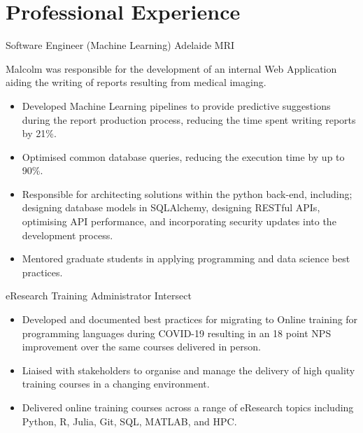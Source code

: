 



\makecvtitle{}
\vspace{-4em}

\section{Professional Experience}

{Software Engineer (Machine Learning)}
{Adelaide MRI}{}{}
{%
  Malcolm was responsible for the development of an internal Web Application
  aiding the writing of reports resulting from medical imaging. 
  \begin{itemize} 
    \item Developed Machine Learning pipelines to provide predictive
      suggestions during the report production process, reducing the time spent
      writing reports by 21\%.
    \item Optimised common database queries, reducing the execution time by
      up to 90\%.
    \item Responsible for architecting solutions
      within the python back-end, including; 
      designing database models in SQLAlchemy,
      designing RESTful APIs,
      optimising API performance,
      and incorporating security updates into the development process.
    \item Mentored graduate students in applying programming and data science
      best practices.
  \end{itemize}
}

{eResearch Training Administrator}
{Intersect}{}{}
{%
  \begin{itemize}
    \item Developed and documented best practices for migrating to Online
      training for programming languages during COVID-19 resulting in an
      18 point NPS improvement over the same courses delivered in person.
    \item Liaised with stakeholders to organise and manage the delivery of high
      quality training courses in a changing environment.
    \item Delivered online training courses across a range of eResearch topics
      including Python, R, Julia, Git, SQL, MATLAB, and HPC.
  \end{itemize}
}

